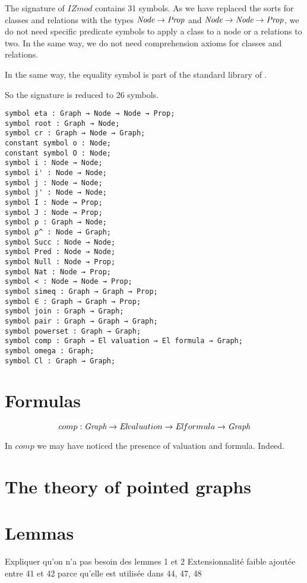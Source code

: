 \documentclass[a4paper]{article}
\begin{document}
The signature of $IZmod$ contains 31 symbols. As we have replaced the
sorts for classes and relations with the \dedukti types
${\mbox{\it Node}} \rightarrow {\mbox{\it Prop}}$ and ${\mbox{\it Node}} \rightarrow {\mbox{\it Node}} \rightarrow {\mbox{\it Prop}}$, we do not need
specific predicate symbols to apply a class to a node or a relations
to two. In the same way, we do not need comprehension axioms for 
classes and relations. 

In the same way, the equality symbol is part of the standard library of 
\dedukti.

So the signature is reduced to 26 symbols. 

\begin{lstlisting}
symbol eta : Graph → Node → Node → Prop;
symbol root : Graph → Node;
symbol cr : Graph → Node → Graph;
constant symbol o : Node;
constant symbol O : Node;
symbol i : Node → Node;
symbol i' : Node → Node;
symbol j : Node → Node;
symbol j' : Node → Node;
symbol I : Node → Prop;
symbol J : Node → Prop;
symbol ρ : Graph → Node;
symbol ρ^ : Node → Graph;
symbol Succ : Node → Node;
symbol Pred : Node → Node;
symbol Null : Node → Prop;
symbol Nat : Node → Prop;
symbol < : Node → Node → Prop;
symbol simeq : Graph → Graph → Prop;
symbol ∈ : Graph → Graph → Prop;
symbol join : Graph → Graph;
symbol pair : Graph → Graph → Graph;
symbol powerset : Graph → Graph;
symbol comp : Graph → El valuation → El formula → Graph;
symbol omega : Graph;
symbol Cl : Graph → Graph;
\end{lstlisting}


\section{Formulas}


$$comp : {\mbox{\it Graph}} \rightarrow {\mbox{\it El}} valuation \rightarrow {\mbox{\it El}} formula \rightarrow {\mbox{\it Graph}}$$

In $comp$ we may have noticed the presence of valuation and formula. 
Indeed.

\section{The theory of pointed graphs}








\section{Lemmas}

Expliquer qu'on n'a pas besoin des lemmes 1 et 2
Extensionnalité faible ajoutée entre 41 et 42 parce qu'elle est utilisée dans 44, 47, 48 
\end{document}
